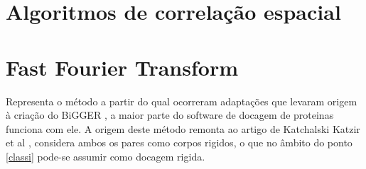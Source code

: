 \section{Algoritmos de correlação espacial}

\section{Fast Fourier Transform}
Representa o método a partir do qual ocorreram adaptações que levaram origem à criação do BiGGER \cite{biggerPaper}, a maior parte do software de docagem de proteinas funciona com ele. A origem deste método remonta ao artigo de Katchalski Katzir et al \cite{teseProf}, considera ambos os pares como corpos rigidos, o que no âmbito do ponto \ref{classi} pode-se assumir como docagem rigida.


